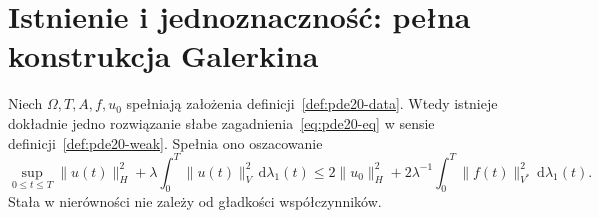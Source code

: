 \section{Istnienie i jednoznaczność: pełna konstrukcja Galerkina}
\begin{twierdzenie}\label{thm:pde20-existence}
Niech $\Omega,T,A,f,u_0$ spełniają założenia
definicji~\ref{def:pde20-data}. Wtedy istnieje dokładnie jedno rozwiązanie
słabe zagadnienia~\eqref{eq:pde20-eq} w sensie
definicji~\ref{def:pde20-weak}. Spełnia ono oszacowanie
\begin{equation}\label{eq:pde20-apriori}
 \sup_{0\le t\le T}\|u(t)\|_H^2
 +\lambda\int_0^T\|u(t)\|_V^2\,\mathrm d\lambda_1(t)
 \le 2\|u_0\|_H^2
 +2\lambda^{-1}\int_0^T\|f(t)\|_{V^*}^2\,\mathrm d\lambda_1(t).
\end{equation}
Stała w nierówności nie zależy od gładkości współczynników.
\end{twierdzenie}
